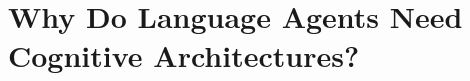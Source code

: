 \chapter[Why Do Language Agents Need Cognitive Architectures?]{Why Do Language Agents Need\\Cognitive Architectures?}
\label{ch:why-language-agents-need-cognitive-architectures}

